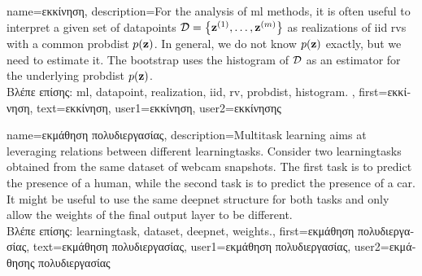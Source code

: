 {name={\foreignlanguage{greek}{εκκίνηση}},
	description={For the analysis of \gls{ml} methods, it is often useful to interpret 
		a given set of \gls{datapoint}s $\mathcal{D} = \big\{ {\bf z}^{(1)},\ldots,{\bf z}^{(m)}\big\}$ 
		as \gls{realization}s of \gls{iid} \gls{rv}s with a common \gls{probdist} $p({\bf z})$. In general, we 
		do not know $p({\bf z})$ exactly, but we need to estimate it. The bootstrap uses the 
		\gls{histogram} of $\mathcal{D}$ as an estimator for the underlying \gls{probdist} $p({\bf z})$.\\
		\foreignlanguage{greek}{Βλέπε επίσης:} \gls{ml}, \gls{datapoint}, \gls{realization}, \gls{iid}, \gls{rv}, \gls{probdist}, \gls{histogram}.
	},
	first={\foreignlanguage{greek}{εκκίνηση}},
	text={\foreignlanguage{greek}{εκκίνηση}},
	user1={\foreignlanguage{greek}{εκκίνηση}}, %
	user2={\foreignlanguage{greek}{εκκίνησης}} %
}

{name={\foreignlanguage{greek}{εκμάθηση πολυδιεργασίας}},
	description={Multitask learning aims at leveraging relations between 
	 different \gls{learningtask}s. Consider two \gls{learningtask}s obtained from the 
	 same \gls{dataset} of webcam snapshots. The first task is to predict the presence 
	 of a human, while the second task is to predict the presence of a car. It might be useful 
	 to use the same \gls{deepnet} structure for both tasks and only allow the \gls{weights} of 
	 the final output layer to be different.\\
	 \foreignlanguage{greek}{Βλέπε επίσης:} \gls{learningtask}, \gls{dataset}, \gls{deepnet}, \gls{weights}.},
	first={\foreignlanguage{greek}{εκμάθηση πολυδιεργασίας}},
	text={\foreignlanguage{greek}{εκμάθηση πολυδιεργασίας}},
	user1={\foreignlanguage{greek}{εκμάθηση πολυδιεργασίας}}, %
	user2={\foreignlanguage{greek}{εκμάθησης πολυδιεργασίας}} %
}

